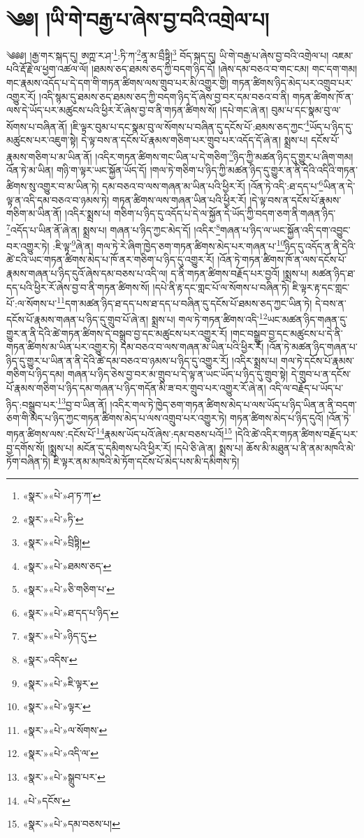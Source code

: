 \chapter{༄༅། །ཡི་གེ་བརྒྱ་པ་ཞེས་བྱ་བའི་འགྲེལ་པ།}༄༅༅། །རྒྱ་གར་སྐད་དུ། ཨཀྵ་ར་ཤ་\footnote{«སྣར་»«པེ་»ཤ་ཏ་ཀ་}:ཏི་ཀ་\footnote{«སྣར་»«པེ་»ཏི་}ནཱ་མ་བྲྀཏྟི།\footnote{«སྣར་»«པེ་»བྲིཏྟི།} བོད་སྐད་དུ། ཡི་གེ་བརྒྱ་པ་ཞེས་བྱ་བའི་འགྲེལ་པ། འཇམ་པའི་རྡོ་རྗེ་ལ་ཕྱག་འཚལ་ལོ། །ཐམས་ཅད་ཐམས་ཅད་ཀྱི་བདག་ཉིད་དོ། །ཞེས་དམ་བཅའ་བ་གང་ངམ། གང་དག་གམ། གང་རྣམས་འདོད་པ་དེ་དག་གི་གཏན་ཚིགས་ལས་གྲུབ་པར་མི་འགྱུར་གྱི། གཏན་ཚིགས་ཉིད་མེད་པར་འགྲུབ་པར་འགྱུར་རོ། །འདི་སྙམ་དུ་ཐམས་ཅད་ཐམས་ཅད་ཀྱི་བདག་ཉིད་དོ་ཞེས་བྱ་བར་དམ་བཅའ་བ་ནི། གཏན་ཚིགས་ཁོ་ན་ལས་དེ་ཡོད་པར་མཚུངས་པའི་ཕྱིར་རོ་ཞེས་བྱ་བ་ནི་གཏན་ཚིགས་སོ། །དཔེ་གང་ཞེ་ན། བུམ་པ་དང་སྣམ་བུ་ལ་སོགས་པ་བཞིན་ནོ། །ཇི་ལྟར་བུམ་པ་དང་སྣམ་བུ་ལ་སོགས་པ་བཞིན་དུ་དངོས་པོ་:ཐམས་ཅད་ཀྱང་\footnote{«སྣར་»«པེ་»ཐམས་ཅད་}ཡོད་པ་ཉིད་དུ་མཚུངས་པར་འཇུག་སྟེ། དེ་ལྟ་བས་ན་དངོས་པོ་རྣམས་གཅིག་པར་གྲུབ་པར་འདོད་དོ་ཞེ་ན། སྨྲས་པ། དངོས་པོ་རྣམས་གཅིག་པ་མ་ཡིན་ནོ། །འདིར་གཏན་ཚིགས་གང་ཡིན་པ་དེ་གཅིག་\footnote{«སྣར་»«པེ་»ཅི་གཅིག་པ་}ཉིད་ཀྱི་མཚན་ཉིད་དུ་གྱུར་པ་ཞིག་གམ། འོན་ཏེ་མ་ཡིན། གཉི་ག་ལྟར་ཡང་སྐྱོན་ཡོད་དོ། །གལ་ཏེ་གཅིག་པ་ཉིད་ཀྱི་མཚན་ཉིད་དུ་གྱུར་ན་ནི་དེའི་འདིའི་གཏན་ཚིགས་སུ་འགྱུར་བ་མ་ཡིན་ཏེ། དམ་བཅའ་བ་ལས་གཞན་མ་ཡིན་པའི་ཕྱིར་རོ། །འོན་ཏེ་འདི་:ཐ་དད་པ་\footnote{«སྣར་»«པེ་»ཐ་དད་པ་ཉིད་}ཡིན་ན་དེ་ལྟ་ན་འདི་དམ་བཅའ་བ་ཉམས་ཏེ། གཏན་ཚིགས་ལས་གཞན་ཡིན་པའི་ཕྱིར་རོ། །དེ་ལྟ་བས་ན་དངོས་པོ་རྣམས་གཅིག་མ་ཡིན་ནོ། །འདིར་སྨྲས་པ། གཅིག་པ་ཉིད་དུ་འདོད་པ་དེ་ལ་སྐྱོན་དེ་ཡོད་ཀྱི་བདག་ཅག་ནི་གཞན་ཉིད་\footnote{«སྣར་»«པེ་»ཉིད་དུ་}འདོད་པ་ཡིན་ནོ་ཞེ་ན། སྨྲས་པ། གཞན་པ་ཉིད་ཀྱང་མེད་དོ། །འདིར་\footnote{«སྣར་»འདིས་}གཞན་པ་ཉིད་ལ་ཡང་སྐྱོན་འདི་དག་འབྱུང་བར་འགྱུར་ཏེ། :ཇི་ལྟ་\footnote{«སྣར་»«པེ་»ཇི་ལྟར་}ཞེ་ན། གལ་ཏེ་རེ་ཞིག་ཁྱེད་ཅག་གཏན་ཚིགས་མེད་པར་གཞན་པ་\footnote{«སྣར་»«པེ་»ལྟར་}ཉིད་དུ་འདོད་ན་ནི་དེའི་ཚེ་ངའི་ཡང་གཏན་ཚིགས་མེད་པ་ཁོ་ནར་གཅིག་པ་ཉིད་དུ་འགྱུར་རོ། །འོན་ཏེ་གཏན་ཚིགས་ཁོ་ན་ལས་དངོས་པོ་རྣམས་གཞན་པ་ཉིད་དུའོ་ཞེས་དམ་བཅས་པ་འདི་ལ། ད་ནི་གཏན་ཚིགས་བརྗོད་པར་བྱའོ། །སྨྲས་པ། མཚན་ཉིད་ཐ་དད་པའི་ཕྱིར་རོ་ཞེས་བྱ་བ་ནི་གཏན་ཚིགས་སོ། །དཔེ་ནི་རྟ་དང་གླང་པོ་ལ་སོགས་པ་བཞིན་ཏེ། ཇི་ལྟར་རྟ་དང་གླང་པོ་:ལ་སོགས་པ་\footnote{«སྣར་»«པེ་»ལ་སོགས་}དག་མཚན་ཉིད་ཐ་དད་པས་ཐ་དད་པ་བཞིན་དུ་དངོས་པོ་ཐམས་ཅད་ཀྱང་ཡིན་ཏེ། དེ་བས་ན་དངོས་པོ་རྣམས་གཞན་པ་ཉིད་དུ་གྲུབ་པོ་ཞེ་ན། སྨྲས་པ། གལ་ཏེ་གཏན་ཚིགས་འདི་\footnote{«སྣར་»«པེ་»འདི་ལ་}ཡང་མཚན་ཉིད་གཞན་དུ་གྱུར་ན་ནི་དེའི་ཚེ་གཏན་ཚིགས་དེ་བསྒྲུབ་བྱ་དང་མཚུངས་པར་འགྱུར་རོ། །གང་བསྒྲུབ་བྱ་དང་མཚུངས་པ་དེ་ནི་གཏན་ཚིགས་མ་ཡིན་པར་འགྱུར་ཏེ། དམ་བཅའ་བ་ལས་གཞན་མ་ཡིན་པའི་ཕྱིར་རོ། །འོན་ཏེ་མཚན་ཉིད་གཞན་པ་ཉིད་དུ་གྱུར་པ་ཡིན་ན་ནི་དེའི་ཚེ་དམ་བཅའ་བ་ཉམས་པ་ཉིད་དུ་འགྱུར་རོ། །འདིར་སྨྲས་པ། གལ་ཏེ་དངོས་པོ་རྣམས་གཅིག་པ་ཉིད་དམ། གཞན་པ་ཉིད་ཅེས་བྱ་བར་མ་གྲུབ་པ་དེ་ལྟ་ན་ཡང་ཡོད་པ་ཉིད་དུ་གྲུབ་སྟེ། དེ་གྲུབ་པ་ན་དངོས་པོ་རྣམས་གཅིག་པ་ཉིད་དམ་གཞན་པ་ཉིད་གདོན་མི་ཟ་བར་གྲུབ་པར་འགྱུར་རོ་ཞེ་ན། འདི་ལ་བརྗོད་པ་ཡོད་པ་ཉིད་:བསྒྲུབ་པར་\footnote{«སྣར་»«པེ་»སྒྲུབ་པར་}བྱ་བ་ཡིན་ནོ། །འདིར་གལ་ཏེ་ཁྱེད་ཅག་གཏན་ཚིགས་མེད་པ་ལས་ཡོད་པ་ཉིད་ཡིན་ན་ནི་བདག་ཅག་གི་མེད་པ་ཉིད་ཀྱང་གཏན་ཚིགས་མེད་པ་ལས་འགྲུབ་པར་འགྱུར་ཏེ། གཏན་ཚིགས་མེད་པ་ཉིད་དུའོ། །འོན་ཏེ་གཏན་ཚིགས་ལས་:དངོས་པོ་\footnote{«པེ་»དངོས་}རྣམས་ཡོད་པའོ་ཞེས་:དམ་བཅས་པའོ།\footnote{«སྣར་»«པེ་»དམ་བཅས་པ།} །དེའི་ཚེ་འདིར་གཏན་ཚིགས་བརྗོད་པར་བྱ་དགོས་སོ། །སྨྲས་པ། མངོན་དུ་དམིགས་པའི་ཕྱིར་རོ། །དཔེ་ཅི་ཞེ་ན། སྨྲས་པ། ཆོས་མི་མཐུན་པ་ནི་ནམ་མཁའི་མེ་ཏོག་བཞིན་ཏེ། ཇི་ལྟར་ནམ་མཁའི་མེ་ཏོག་དངོས་པོ་མེད་པས་མི་དམིགས་ཏེ། 